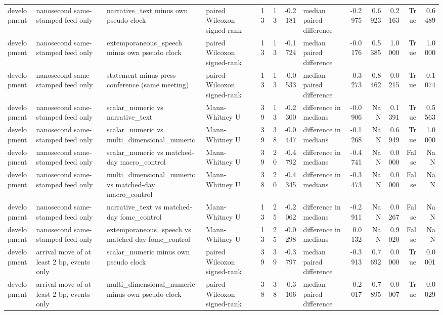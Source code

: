\begin{tabular}{llllrrrlrrrrr}
development & nanosecond same-stamped feed only & narrative_text minus own pseudo clock & paired Wilcoxon signed-rank & 13 & 13 & -0.2181 & median paired difference & -0.2975 & 0.6923 & 0.2163 & True & 0.6489 \\
development & nanosecond same-stamped feed only & extemporaneous_speech minus own pseudo clock & paired Wilcoxon signed-rank & 13 & 13 & -0.1724 & median paired difference & -0.0176 & 0.5385 & 1.0000 & True & 1.0000 \\
development & nanosecond same-stamped feed only & statement minus press conference (same meeting) & paired Wilcoxon signed-rank & 13 & 13 & -0.0533 & median paired difference & -0.3273 & 0.8462 & 0.0215 & True & 0.1074 \\
development & nanosecond same-stamped feed only & scalar_numeric vs narrative_text & Mann-Whitney U & 39 & 13 & -0.2300 & difference in medians & -0.0906 & NaN & 0.1391 & True & 0.5563 \\
development & nanosecond same-stamped feed only & scalar_numeric vs multi_dimensional_numeric & Mann-Whitney U & 39 & 38 & -0.0447 & difference in medians & -0.1268 & NaN & 0.6949 & True & 1.0000 \\
development & nanosecond same-stamped feed only & scalar_numeric vs matched-day macro_control & Mann-Whitney U & 39 & 20 & -0.4792 & difference in medians & -0.4741 & NaN & 0.0000 & False & NaN \\
development & nanosecond same-stamped feed only & multi_dimensional_numeric vs matched-day macro_control & Mann-Whitney U & 38 & 20 & -0.4345 & difference in medians & -0.3473 & NaN & 0.0000 & False & NaN \\
development & nanosecond same-stamped feed only & narrative_text vs matched-day fomc_control & Mann-Whitney U & 13 & 25 & -0.2062 & difference in medians & -0.2911 & NaN & 0.0267 & False & NaN \\
development & nanosecond same-stamped feed only & extemporaneous_speech vs matched-day fomc_control & Mann-Whitney U & 13 & 25 & -0.0298 & difference in medians & 0.0132 & NaN & 0.9020 & False & NaN \\
development & arrival move of at least 2 bp, events only & scalar_numeric minus own pseudo clock & paired Wilcoxon signed-rank & 39 & 39 & -0.3797 & median paired difference & -0.3913 & 0.7692 & 0.0000 & True & 0.0001 \\
development & arrival move of at least 2 bp, events only & multi_dimensional_numeric minus own pseudo clock & paired Wilcoxon signed-rank & 38 & 38 & -0.3106 & median paired difference & -0.2017 & 0.7895 & 0.0007 & True & 0.0029 \\

\end{tabular}
